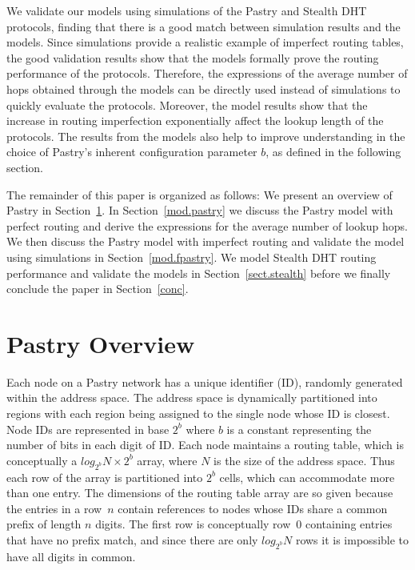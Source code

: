 \documentclass[10pt,twocolumn]{article}
\begin{document}
We validate our models using simulations of the Pastry and Stealth DHT
protocols, finding that there is a good match between simulation results and
the models. Since simulations provide a realistic example of imperfect routing
tables, the good validation results show that the models formally prove the
routing performance of the protocols. Therefore, the expressions of the average
number of hops obtained through the models can be directly used instead of
simulations to quickly evaluate the protocols. Moreover, the model results show
that the increase in routing imperfection exponentially affect the lookup
length of the protocols. The results from the models also help to improve
understanding in the choice of Pastry's inherent configuration parameter $b$,
as defined in the following section.

The remainder of this paper is organized as follows: We present an
overview of Pastry in Section~\ref{sect.pastry}. In
Section~\ref{mod.pastry} we discuss the Pastry model with perfect
routing and derive the expressions for the average number of lookup
hops. We then discuss the Pastry model with imperfect routing and
validate the model using simulations in Section~\ref{mod.fpastry}.
We model Stealth DHT routing performance and validate the models in
Section~\ref{sect.stealth} before we finally conclude the paper in
Section~\ref{conc}.


\section{Pastry  Overview} \label{sect.pastry} Each node on a
Pastry network has a unique identifier (ID), randomly generated within the
address space. The address space is dynamically partitioned into regions with
each region being assigned to the single node whose ID is closest. Node IDs are
represented in base $2^b$ where $b$ is a constant representing the number of
bits in each digit of ID. Each node maintains a routing table, which is
conceptually a $log_{2^b}N \times 2^b$ array, where $N$ is the size of the
address space. Thus each row of the array is partitioned into $2^b$ cells,
which can accommodate more than one entry. The dimensions of the routing table
array are so given because the entries in a row~$n$ contain references to nodes
whose IDs share a common prefix of length $n$ digits. The first row is
conceptually row~$0$ containing entries that have no prefix match, and since
there are only $log_{2^b}N$ rows it is impossible to have all digits in common.
\end{document}
